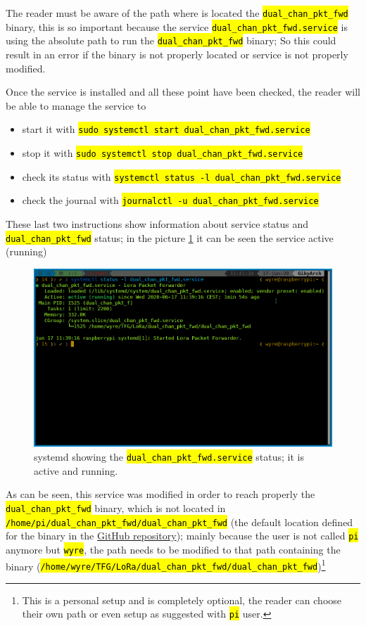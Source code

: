 \documentclass[11pt,a4paper,dvipsnames,twoside]{article}
\newcommand{\cmd}[1] {\hl{\texttt{#1}}}
\begin{document}
The reader must be aware of the path where is located the \cmd{dual\_chan\_pkt\_fwd} binary, this is so important because the service \cmd{dual\_chan\_pkt\_fwd.service} is using the absolute path to run the \cmd{dual\_chan\_pkt\_fwd} binary; So this could result in an error if the binary is not properly located or service is not properly modified.

Once the service is installed and all these point have been checked, the reader will be able to manage the service to

\begin{itemize}
  \item start it with \cmd{sudo systemctl start dual\_chan\_pkt\_fwd.service}
  \item stop it with \cmd{sudo systemctl stop dual\_chan\_pkt\_fwd.service}
  \item check its status with \cmd{systemctl status -l dual\_chan\_pkt\_fwd.service}
  \item check the journal with \cmd{journalctl -u dual\_chan\_pkt\_fwd.service}
\end{itemize}

These last two instructions show information about service status and \cmd{dual\_chan\_pkt\_fwd} status; in the picture \ref{fig:dual_chan_pkt_fwd-status} it can be seen the service active (running)

\begin{figure}[ht]
  \centering
  \includegraphics[width=.9\textwidth]{../pictures/pkt_fwd-service.png}
  \caption{systemd showing the \cmd{dual\_chan\_pkt\_fwd.service} status; it is active and running.}
  \label{fig:dual_chan_pkt_fwd-status}
\end{figure}

As can be seen, this service was modified in order to reach properly the \cmd{dual\_chan\_pkt\_fwd} binary, which is not located in \cmd{/home/pi/dual\_chan\_pkt\_fwd/dual\_chan\_pkt\_fwd} (the default location defined for the binary in the \href{https://github.com/dragino/dual_chan_pkt_fwd/blob/master/dual_chan_pkt_fwd.service#L9}{GitHub repository}); mainly because the user is not called \cmd{pi} anymore but \cmd{wyre}, the path needs to be modified to that path containing the binary (\cmd{/home/wyre/TFG/LoRa/dual\_chan\_pkt\_fwd/dual\_chan\_pkt\_fwd})\footnote{This is a personal setup and is completely optional, the reader can choose their own path or even setup as suggested with \cmd{pi} user.}
\end{document}

